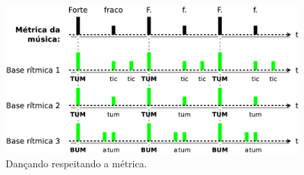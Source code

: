 \begin{figure}[!h]
    \centering 
    \includegraphics[width=0.99\textwidth]{chapters/cap-musicalidade/fora-do-ritmo-com.eps}
    \caption{Dançando respeitando a métrica.}
    \label{fig:fora-do-ritmo-com}
\end{figure}

